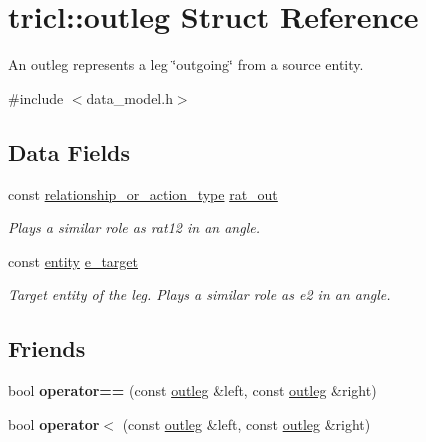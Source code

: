 \hypertarget{structtricl_1_1outleg}{}\section{tricl\+:\+:outleg Struct Reference}
\label{structtricl_1_1outleg}


An outleg represents a leg \char`\"{}outgoing\char`\"{} from a source entity.  




{\ttfamily \#include $<$data\+\_\+model.\+h$>$}

\subsection*{Data Fields}
\begin{DoxyCompactItemize}
\item 
\mbox{\label{structtricl_1_1outleg_a9d277a290319b2f61d013edf38683552}} 
const \hyperlink{namespacetricl_a2d01894944fb58a8fedc0912a48d13f8}{relationship\+\_\+or\+\_\+action\+\_\+type} \hyperlink{structtricl_1_1outleg_a9d277a290319b2f61d013edf38683552}{rat\+\_\+out}
\begin{DoxyCompactList}\small\item\em Plays a similar role as {\ttfamily rat12} in an angle. \end{DoxyCompactList}\item 
\mbox{\label{structtricl_1_1outleg_a683c81d22075ccd28e8f0262f493bc19}} 
const \hyperlink{namespacetricl_a57273122278e8b301844e2a2e1f0742f}{entity} \hyperlink{structtricl_1_1outleg_a683c81d22075ccd28e8f0262f493bc19}{e\+\_\+target}
\begin{DoxyCompactList}\small\item\em Target entity of the leg. Plays a similar role as {\ttfamily e2} in an angle. \end{DoxyCompactList}\end{DoxyCompactItemize}
\subsection*{Friends}
\begin{DoxyCompactItemize}
\item 
\mbox{\label{structtricl_1_1outleg_a925572d2a4bc56d312134f995f7790a5}} 
bool {\bfseries operator==} (const \hyperlink{structtricl_1_1outleg}{outleg} \&left, const \hyperlink{structtricl_1_1outleg}{outleg} \&right)
\item 
\mbox{\label{structtricl_1_1outleg_a594b6be76b1271da95305f64d3f28f52}} 
bool {\bfseries operator$<$} (const \hyperlink{structtricl_1_1outleg}{outleg} \&left, const \hyperlink{structtricl_1_1outleg}{outleg} \&right)
\end{DoxyCompactItemize}


